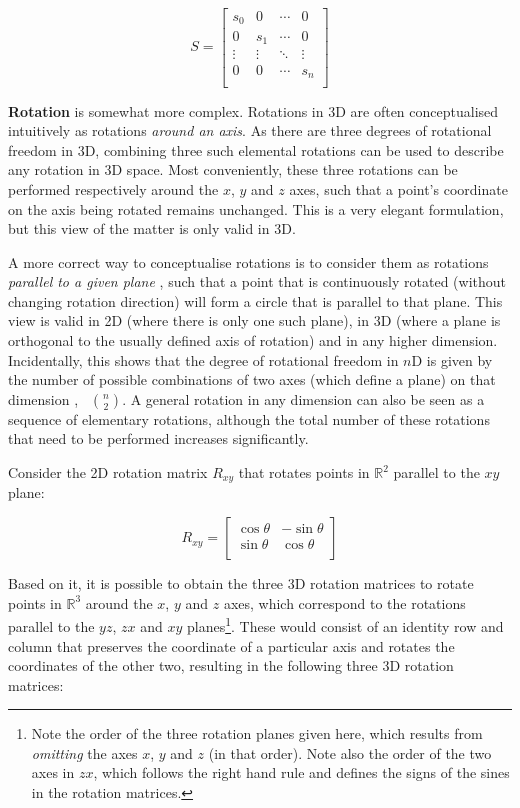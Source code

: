 \begin{equation*}
S = \begin{bmatrix}
s_0 & 0 & \cdots & 0 \\
0 & s_1 & \cdots & 0 \\
\vdots & \vdots & \ddots & \vdots \\
0 & 0 & \cdots & s_n \\
\end{bmatrix}
\end{equation*}

\textbf{Rotation} is somewhat more complex.
Rotations in 3D are often conceptualised intuitively as rotations \emph{around an axis}.
As there are three degrees of rotational freedom in 3D, combining three such elemental rotations can be used to describe any rotation in 3D space.
Most conveniently, these three rotations can be performed respectively around the $x$, $y$ and $z$ axes, such that a point's coordinate on the axis being rotated remains unchanged.
This is a very elegant formulation, but this view of the matter is only valid in 3D.

A more correct way to conceptualise rotations is to consider them as rotations \emph{parallel to a given plane} \citep{Hollasch91}, such that a point that is continuously rotated (without changing rotation direction) will form a circle that is parallel to that plane.
This view is valid in 2D (where there is only one such plane), in 3D (where a plane is orthogonal to the usually defined axis of rotation) and in any higher dimension.
Incidentally, this shows that the degree of rotational freedom in $n$D is given by the number of possible combinations of two axes (which define a plane) on that dimension \citep{Hanson94}, \ie\ $\binom{n}{2}$.
A general rotation in any dimension can also be seen as a sequence of elementary rotations, although the total number of these rotations that need to be performed increases significantly.

Consider the 2D rotation matrix $R_{xy}$ that rotates points in $\mathbb{R}^2$ parallel to the $xy$ plane:

\begin{equation*}
R_{xy} = \begin{bmatrix}
\cos \theta & -\sin \theta \\
\sin \theta & \cos \theta \\
\end{bmatrix}
\end{equation*}

Based on it, it is possible to obtain the three 3D rotation matrices to rotate points in $\mathbb{R}^3$ around the $x$, $y$ and $z$ axes, which correspond to the rotations parallel to the $yz$, $zx$ and $xy$ planes\footnote{Note the order of the three rotation planes given here, which results from \emph{omitting} the axes $x$, $y$ and $z$ (in that order).
Note also the order of the two axes in $zx$, which follows the right hand rule and defines the signs of the sines in the rotation matrices.}.
These would consist of an identity row and column that preserves the coordinate of a particular axis and rotates the coordinates of the other two, resulting in the following three 3D rotation matrices:

